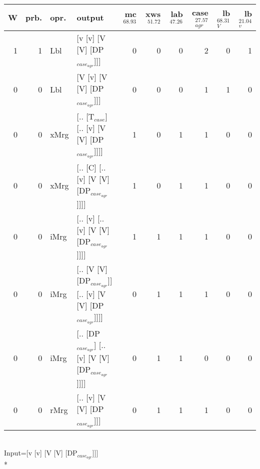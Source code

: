 \begin{tabularx}{\linewidth}{rrlXrrrrrr}
\hline
   W &   prb. & opr.   & output                                                    &   mc$^{68.93}$ &   xws$^{51.72}$ &   lab$^{47.26}$ &   case$_{agr}^{27.57}$ &   lb$_{V}^{68.31}$ &   lb$_{v}^{21.04}$ \\
\hline
   1 &   1 & Lbl  & [v [v] [V [V] [DP$_{case_{agr}}$]]]                             &            0 &             0 &             0 &                  2 &              0 &              1 \\
   0 &   0 & Lbl  & [V [v] [V [V] [DP$_{case_{agr}}$]]]                             &            0 &             0 &             0 &                  1 &              1 &              0 \\
   0 &   0 & xMrg & [.. [T$_{case}$] [.. [v] [V [V] [DP$_{case_{agr}}$]]]]              &            1 &             0 &             1 &                  1 &              0 &              0 \\
   0 &   0 & xMrg & [.. [C] [.. [v] [V [V] [DP$_{case_{agr}}$]]]]                   &            1 &             0 &             1 &                  1 &              0 &              0 \\
   0 &   0 & iMrg & [.. [v] [.. [v] [V [V] [DP$_{case_{agr}}$]]]]                   &            1 &             1 &             1 &                  1 &              0 &              0 \\
   0 &   0 & iMrg & [.. [V [V] [DP$_{case_{agr}}$]] [.. [v] [V [V] [DP$_{case_{agr}}$]]]] &            0 &             1 &             1 &                  1 &              0 &              0 \\
   0 &   0 & iMrg & [.. [DP$_{case_{agr}}$] [.. [v] [V [V] [DP$_{case_{agr}}$]]]]         &            0 &             1 &             1 &                  0 &              0 &              0 \\
   0 &   0 & rMrg & [.. [v] [V [V] [DP$_{case_{agr}}$]]]                            &            0 &             1 &             1 &                  1 &              0 &              0 \\
\hline
\end{tabularx}\endgroup\\
\begingroup\scriptsize Input=[v [v] [V [V] [DP$_{case_{agr}}$]]]\\*
